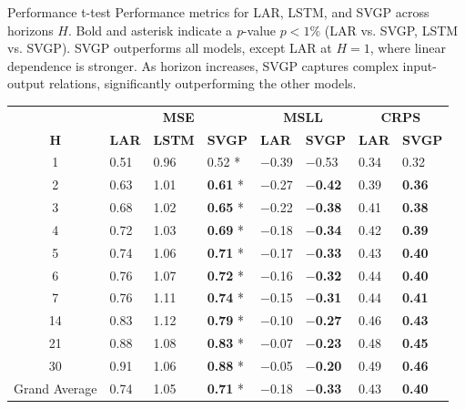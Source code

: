 \begin{frame}{Performance t-test}
	Performance metrics for LAR, LSTM, and SVGP across horizons $H$. Bold and asterisk indicate a \emph{p}-value $p<1\%$ (LAR vs. SVGP, LSTM vs. SVGP). SVGP outperforms all models, except LAR at $H=1$, where linear dependence is stronger. As horizon increases, SVGP captures complex input-output relations, significantly outperforming the other models.
	
	\tiny
	\begin{table}[htbp]
		\begin{tabular}{c p{1cm}p{1.0cm}p{1.0cm}p{1.0cm}p{1.0cm}p{1.0cm}p{1.0cm}}
			\toprule
			& \multicolumn{3}{c}{\textbf{MSE}} & \multicolumn{2}{c}{\textbf{MSLL}} & \multicolumn{2}{c}{\textbf{CRPS}} \\
			\cmidrule{2-8}
			\( \textbf{H} \) & \textbf{LAR} & \textbf{LSTM} & \textbf{SVGP} & \textbf{LAR} & \textbf{SVGP} & \textbf{LAR} & \textbf{SVGP} \\
			\midrule
			1  & 0.51 & 0.96 & 0.52 * & $-$0.39 & $-$0.53 & 0.34 & 0.32 \\
			2  & 0.63 & 1.01 & \textbf{0.61} * & $-$0.27 & \textbf{$-$0.42} & 0.39 & \textbf{0.36} \\
			3  & 0.68 & 1.02 & \textbf{0.65} * & $-$0.22 & \textbf{$-$0.38} & 0.41 & \textbf{0.38} \\
			4  & 0.72 & 1.03 & \textbf{0.69} * & $-$0.18 & \textbf{$-$0.34} & 0.42 & \textbf{0.39} \\
			5  & 0.74 & 1.06 & \textbf{0.71} * & $-$0.17 & \textbf{$-$0.33} & 0.43 & \textbf{0.40} \\
			6  & 0.76 & 1.07 & \textbf{0.72} * & $-$0.16 & \textbf{$-$0.32} & 0.44 & \textbf{0.40} \\
			7  & 0.76 & 1.11 & \textbf{0.74} * & $-$0.15 & \textbf{$-$0.31} & 0.44 & \textbf{0.41} \\
			14 & 0.83 & 1.12 & \textbf{0.79} * & $-$0.10 & \textbf{$-$0.27} & 0.46 & \textbf{0.43} \\
			21 & 0.88 & 1.08 & \textbf{0.83} * & $-$0.07 & \textbf{$-$0.23} & 0.48 & \textbf{0.45} \\
			30 & 0.91 & 1.06 & \textbf{0.88} * & $-$0.05 & \textbf{$-$0.20} & 0.49 & \textbf{0.46} \\
			\midrule
			Grand Average & 0.74 & 1.05 & \textbf{0.71} * & $-$0.18 & \textbf{$-$0.33} & 0.43 & \textbf{0.40} \\
			\bottomrule
		\end{tabular}
		
	\end{table}
\end{frame}

